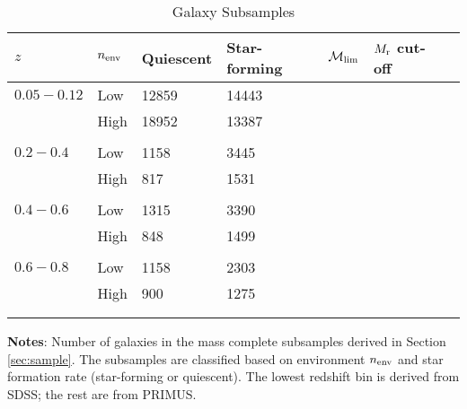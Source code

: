 \documentclass{emulateapj}
\begin{document}
\begin{table} %
  \caption{Galaxy Subsamples}
  \label{tab:subsample}
  \begin{center}
    \leavevmode
    \begin{tabular}{l l l l l l l } \hline \hline              
    $z$ &$n_{\rm{env}}$        &Quiescent  &Star-forming  & $\mathcal{M}_{\rm{lim}}$ & $M_{\rm{r}}$ cut-off \\ \hline 
$0.05-0.12$ &Low           &12859                       &14443                           \\
               &High            &18952                       &13387                           \\ 
                              &               &                       &                           \\ \hline
$0.2-0.4$      &Low           &1158                    &3445                           \\
               &High            &817                    &1531                           \\
               &               &                       &                           \\ \hline
$0.4-0.6$      &Low           &1315                       &3390                           \\
               &High            &848                       &1499                           \\
               &               &                       &                           \\ \hline
$0.6-0.8$      &Low           &1158                       &2303                           \\
               &High            &900                       &1275                           \\
               &               &                       &                           \\ \hline
  \multicolumn{4}{l}{}                                             \\       
    \end{tabular} \par
    \end{center}
    {\bf Notes}: Number of galaxies in the mass complete subsamples derived in Section \ref{sec:sample}. The subsamples are classified based on environment $n_{\rm{env}}$ and star formation rate (star-forming or quiescent). The lowest redshift bin is derived from SDSS; the rest are from PRIMUS. 
    \bigskip
\end{table}
\end{document}
